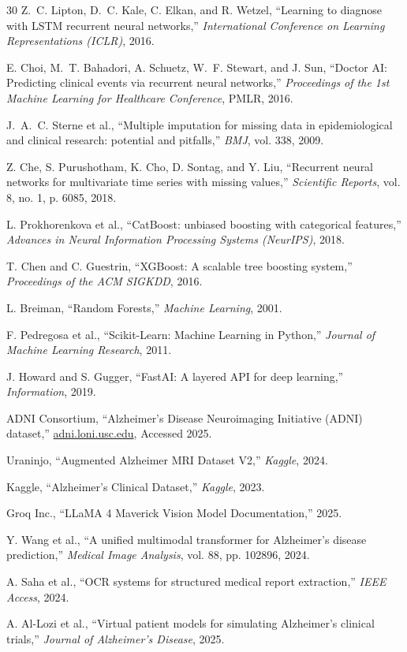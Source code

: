 \documentclass[12pt,singleside,a4paper]{article}
\begin{document}
\begin{thebibliography}{30}
Z.~C. Lipton, D.~C. Kale, C. Elkan, and R. Wetzel, ``Learning to diagnose with LSTM recurrent neural networks,'' \textit{International Conference on Learning Representations (ICLR)}, 2016.

E. Choi, M.~T. Bahadori, A. Schuetz, W.~F. Stewart, and J. Sun, ``Doctor AI: Predicting clinical events via recurrent neural networks,'' \textit{Proceedings of the 1st Machine Learning for Healthcare Conference}, PMLR, 2016.

J.~A.~C. Sterne et al., ``Multiple imputation for missing data in epidemiological and clinical research: potential and pitfalls,'' \textit{BMJ}, vol. 338, 2009.

Z. Che, S. Purushotham, K. Cho, D. Sontag, and Y. Liu, ``Recurrent neural networks for multivariate time series with missing values,'' \textit{Scientific Reports}, vol. 8, no. 1, p. 6085, 2018.

L. Prokhorenkova et al., ``CatBoost: unbiased boosting with categorical features,'' \textit{Advances in Neural Information Processing Systems (NeurIPS)}, 2018.

T. Chen and C. Guestrin, ``XGBoost: A scalable tree boosting system,'' \textit{Proceedings of the ACM SIGKDD}, 2016.

L. Breiman, ``Random Forests,'' \textit{Machine Learning}, 2001.

F. Pedregosa et al., ``Scikit-Learn: Machine Learning in Python,'' \textit{Journal of Machine Learning Research}, 2011.

J. Howard and S. Gugger, ``FastAI: A layered API for deep learning,'' \textit{Information}, 2019.

ADNI Consortium, ``Alzheimer's Disease Neuroimaging Initiative (ADNI) dataset,'' \url{adni.loni.usc.edu}, Accessed 2025.

Uraninjo, ``Augmented Alzheimer MRI Dataset V2,'' \textit{Kaggle}, 2024.

Kaggle, ``Alzheimer's Clinical Dataset,'' \textit{Kaggle}, 2023.

Groq Inc., ``LLaMA 4 Maverick Vision Model Documentation,'' 2025.

Y. Wang et al., ``A unified multimodal transformer for Alzheimer's disease prediction,'' \textit{Medical Image Analysis}, vol. 88, pp. 102896, 2024.

A. Saha et al., ``OCR systems for structured medical report extraction,'' \textit{IEEE Access}, 2024.

A. Al-Lozi et al., ``Virtual patient models for simulating Alzheimer's clinical trials,'' \textit{Journal of Alzheimer's Disease}, 2025.

\end{thebibliography}
\end{document}
